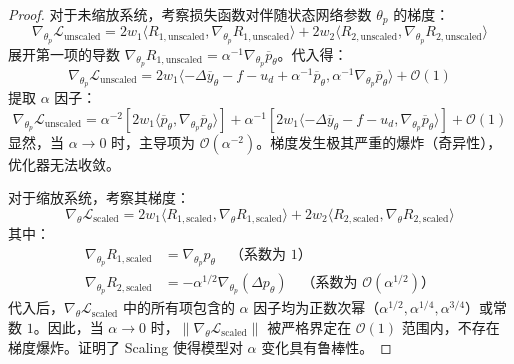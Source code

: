 \documentclass[a4paper, 11pt]{ctexart}
\begin{document}
\begin{proof}
对于未缩放系统，考察损失函数对伴随状态网络参数 $\theta_p$ 的梯度：
\begin{equation}
    \nabla_{\theta_p} \mathcal{L}_{\text{unscaled}} = 2w_1 \langle R_{1, \text{unscaled}}, \nabla_{\theta_p} R_{1, \text{unscaled}} \rangle + 2w_2 \langle R_{2, \text{unscaled}}, \nabla_{\theta_p} R_{2, \text{unscaled}} \rangle
\end{equation}
展开第一项的导数 $\nabla_{\theta_p} R_{1, \text{unscaled}} = \alpha^{-1} \nabla_{\theta_p} \overline{p}_\theta$。代入得：
\begin{equation}
    \nabla_{\theta_p} \mathcal{L}_{\text{unscaled}} = 2w_1 \langle -\Delta\overline{y}_\theta - f - u_d + \alpha^{-1}\overline{p}_\theta, \alpha^{-1} \nabla_{\theta_p} \overline{p}_\theta \rangle + \mathcal{O}(1)
\end{equation}
提取 $\alpha$ 因子：
\begin{equation}
    \nabla_{\theta_p} \mathcal{L}_{\text{unscaled}} = \alpha^{-2} \left[ 2w_1 \langle \overline{p}_\theta, \nabla_{\theta_p} \overline{p}_\theta \rangle \right] + \alpha^{-1} \left[ 2w_1 \langle -\Delta\overline{y}_\theta - f - u_d, \nabla_{\theta_p} \overline{p}_\theta \rangle \right] + \mathcal{O}(1)
\end{equation}
显然，当 $\alpha \to 0$ 时，主导项为 $\mathcal{O}(\alpha^{-2})$。梯度发生极其严重的爆炸（奇异性），优化器无法收敛。

对于缩放系统，考察其梯度：
\begin{equation}
    \nabla_{\theta} \mathcal{L}_{\text{scaled}} = 2w_1 \langle R_{1, \text{scaled}}, \nabla_\theta R_{1, \text{scaled}} \rangle + 2w_2 \langle R_{2, \text{scaled}}, \nabla_\theta R_{2, \text{scaled}} \rangle
\end{equation}
其中：
\begin{align}
    \nabla_{\theta_p} R_{1, \text{scaled}} &= \nabla_{\theta_p} p_\theta \quad \text{（系数为 } 1 \text{）} \\
    \nabla_{\theta_p} R_{2, \text{scaled}} &= -\alpha^{1/2}\nabla_{\theta_p} (\Delta p_\theta) \quad \text{（系数为 } \mathcal{O}(\alpha^{1/2}) \text{）}
\end{align}
代入后，$\nabla_{\theta} \mathcal{L}_{\text{scaled}}$ 中的所有项包含的 $\alpha$ 因子均为正数次幂（$\alpha^{1/2}, \alpha^{1/4}, \alpha^{3/4}$）或常数 $1$。因此，当 $\alpha \to 0$ 时，$\|\nabla_{\theta} \mathcal{L}_{\text{scaled}}\|$ 被严格界定在 $\mathcal{O}(1)$ 范围内，不存在梯度爆炸。证明了 Scaling 使得模型对 $\alpha$ 变化具有鲁棒性。
\end{proof}
\end{document}
